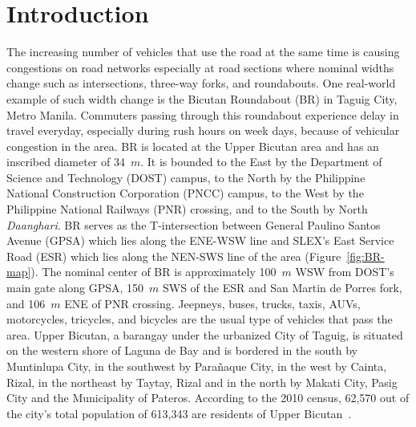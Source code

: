 \documentclass[preprint]{./acm_proc_article-sp}
\begin{document}
\section{Introduction}
The increasing number of vehicles that use the road at the same time is causing congestions on road networks  especially at road sections where nominal widths change such as intersections, three-way forks, and roundabouts. One real-world example of such width change is the Bicutan Roundabout (BR) in Taguig City, Metro Manila. Commuters passing through this roundabout experience delay in travel everyday, especially during rush hours on week days, because of vehicular congestion in the area. BR is located at the Upper Bicutan area and has an inscribed diameter of 34~$m$. It is bounded to the East by the Department of Science and Technology (DOST) campus, to the North by the Philippine National Construction Corporation (PNCC) campus, to the West by the Philippine National Railways (PNR) crossing, and to the South by North {\em Daanghari}. BR serves as the T-intersection between General Paulino Santos Avenue (GPSA) which lies along the ENE-WSW line and SLEX's East Service Road (ESR) which lies along the NEN-SWS line of the area (Figure~\ref{fig:BR-map}). The nominal center of BR is approximately 100~$m$ WSW from DOST's main gate along GPSA, 150~$m$ SWS of the ESR and San Martin de Porres fork, and 106~$m$ ENE of PNR crossing. Jeepneys, buses, trucks, taxis, AUVs, motorcycles, tricycles, and bicycles are the usual type of vehicles that pass the area. Upper Bicutan, a barangay under the urbanized City of Taguig, is situated on the western shore of Laguna de Bay and is bordered in the south by Muntinlupa City, in the southwest by Para\~naque City, in the west by Cainta, Rizal, in the northeast by Taytay, Rizal and in the north by Makati City, Pasig City and the Municipality of Pateros. According to the 2010 census, 62,570 out of the city's total population of 613,343 are residents of Upper Bicutan~\citep{taguig-web}.

\begin{figure*}[bt]
\centering{}
\caption{The area map of Upper Bicutan, Taguig City showing the relative location of BR~\citep{googlemap13}.}\label{fig:BR-map}
\end{figure*}
\end{document}
